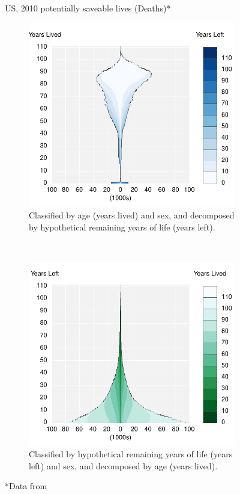 \documentclass{article}
\begin{document}
\begin{figure}
\centering
\caption{US, 2010 potentially saveable lives (Deaths)*}
\label{fig:1}
\begin{subfigure}[b]{.48\linewidth}
\centering
	\caption{Classified by age (years lived) and sex, and decomposed
by hypothetical remaining years of life (years left).}
	\label{fig:Day}
	\includegraphics[scale=.55]{Figures/Deathsxy10.pdf}	
\end{subfigure}
~
\begin{subfigure}[b]{.48\linewidth}
\centering
    \caption{Classified by hypothetical remaining years of life
(years left) and sex, and decomposed by age (years lived).}
	\label{fig:Dya}
    \includegraphics[scale=.55]{Figures/Deathsyx10.pdf}
\end{subfigure}
\caption*{*Data from }
\end{figure}
\end{document}
